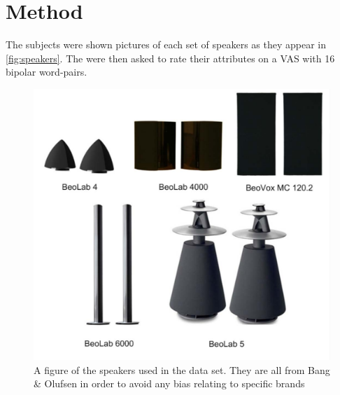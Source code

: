 \section*{Method}
\label{Method}
The subjects were shown pictures of each set of speakers as they appear in \autoref{fig:speakers}. The were then asked to rate their attributes on a VAS with 16 bipolar word-pairs. 

\begin{figure}[H]
\centering
\includegraphics[scale = 0.7]{Figure/speakers.png}
\caption{A figure of the speakers used in the data set. They are all from Bang \& Olufsen in order to avoid any bias relating to specific brands}
\label{fig:speakers}
\end{figure}